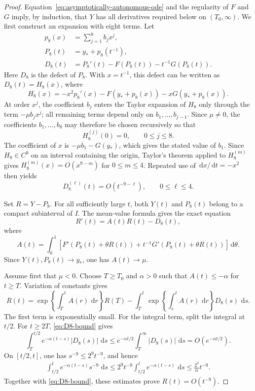 \documentclass[12pt]{amsart}
\numberwithin{equation}{section}
\theoremstyle{plain}
\theoremstyle{definition}
\newcommand{\dd}{\,\mathrm d}
\begin{document}
\begin{proof}
Equation~\eqref{eq:asymptotically-autonomous-ode} and the regularity of
$F$ and $G$ imply, by induction, that $Y$ has all derivatives required below
on $(T_0,\infty)$.  We first construct an expansion with eight terms.  Let
\[
\begin{aligned}
 p_8(x)&=\sum_{j=1}^8 b_jx^j,\\
 P_8(t)&=y_*+p_8(t^{-1}),\\
 D_8(t)&=P_8'(t)-F(P_8(t))-t^{-1}G(P_8(t)).
\end{aligned}
\]
Here $D_8$ is the defect of $P_8$.
With $x=t^{-1}$, this defect can be written as $D_8(t)=H_8(x)$, where
\[
 H_8(x)=-x^2p_8'(x)-F(y_*+p_8(x))-xG(y_*+p_8(x)).
\]
At order $x^j$, the coefficient $b_j$ enters the Taylor expansion of
$H_8$ only through the term $-\mu b_jx^j$; all remaining terms depend only
on $b_1,\ldots,b_{j-1}$.  Since $\mu\ne0$, the coefficients
$b_1,\ldots,b_8$ may therefore be chosen recursively so that
\[
 H_8^{(j)}(0)=0,
 \qquad 0\le j\le8.
\]
The coefficient of $x$ is $-\mu b_1-G(y_*)$, which gives the stated value of
$b_1$.  Since $H_8\in C^9$ on an interval containing the origin, Taylor's
theorem applied to $H_8^{(m)}$ gives
$H_8^{(m)}(x)=O(x^{9-m})$ for $0\le m\le4$.  Repeated use of
$\dd x/\dd t=-x^2$ then yields
\begin{equation}
 D_8^{(\ell)}(t)=O(t^{-9-\ell}),
 \qquad 0\le\ell\le4.
 \label{eq:D8-bound}
\end{equation}

Set $R=Y-P_8$.  For all sufficiently large $t$, both $Y(t)$ and $P_8(t)$
belong to a compact subinterval of $I$.  The mean-value formula gives the
exact equation
\begin{equation}
 R'(t)=A(t)R(t)-D_8(t),
 \label{eq:R-linear-equation}
\end{equation}
where
\[
 A(t)=\int_0^1\left[
 F'(P_8(t)+\theta R(t))
 +t^{-1}G'(P_8(t)+\theta R(t))
 \right]\dd\theta.
\]
Since $Y(t),P_8(t)\to y_*$, one has $A(t)\to\mu$.

Assume first that $\mu<0$.  Choose $T\ge T_0$ and $\alpha>0$ such that
$A(t)\le-\alpha$ for $t\ge T$.  Variation of constants gives
\begin{equation*}
 R(t)=\exp\left\{\int_T^tA(r)\,\dd r\right\}R(T)
 -\int_T^t\exp\left\{\int_s^tA(r)\,\dd r\right\}D_8(s)\,\dd s.
\end{equation*}
The first term is exponentially small.  For the integral term, split the
integral at $t/2$.  For $t\ge2T$, \eqref{eq:D8-bound} gives
\[
 \int_T^{t/2}e^{-\alpha(t-s)}|D_8(s)|\,\dd s
 \le e^{-\alpha t/2}\int_T^\infty|D_8(s)|\,\dd s
 =O(e^{-\alpha t/2}).
\]
On $[t/2,t]$, one has $s^{-9}\le2^9t^{-9}$, and hence
\[
\begin{aligned}
 \int_{t/2}^t e^{-\alpha(t-s)}s^{-9}\,\dd s
 \le 2^9t^{-9}
   \int_{t/2}^t e^{-\alpha(t-s)}\,\dd s
 \le \frac{2^9}{\alpha}t^{-9}.
\end{aligned}
\]
Together with \eqref{eq:D8-bound}, these estimates prove
$R(t)=O(t^{-9})$.


\end{proof}
\end{document}
